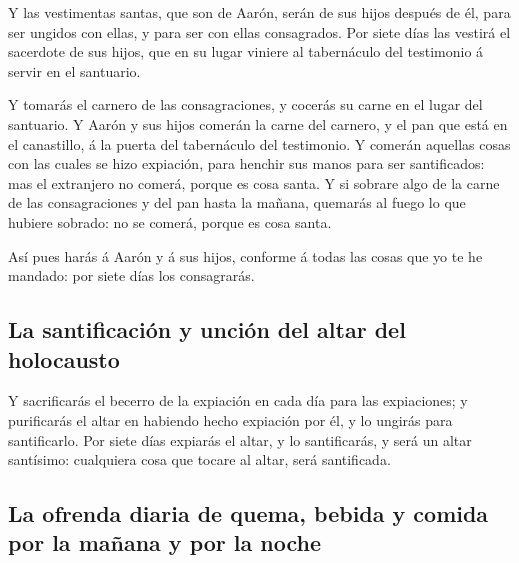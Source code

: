  Y las vestimentas santas, que son de Aarón, serán de sus
hijos después de él, para ser ungidos con ellas, y para ser con ellas
consagrados.  Por siete días las vestirá el sacerdote de
sus hijos, que en su lugar viniere al tabernáculo del testimonio á
servir en el santuario.

 Y tomarás el carnero de las consagraciones, y cocerás su
carne en el lugar del santuario.  Y Aarón y sus hijos
comerán la carne del carnero, y el pan que está en el canastillo, á la
puerta del tabernáculo del testimonio.  Y comerán
aquellas cosas con las cuales se hizo expiación, para henchir sus manos
para ser santificados: mas el extranjero no comerá, porque es cosa
santa.  Y si sobrare algo de la carne de las
consagraciones y del pan hasta la mañana, quemarás al fuego lo que
hubiere sobrado: no se comerá, porque es cosa santa.

 Así pues harás á Aarón y á sus hijos, conforme á todas
las cosas que yo te he mandado: por siete días los consagrarás.

\hypertarget{la-santificaciuxf3n-y-unciuxf3n-del-altar-del-holocausto}{%
\subsection{La santificación y unción del altar del
holocausto}\label{la-santificaciuxf3n-y-unciuxf3n-del-altar-del-holocausto}}

 Y sacrificarás el becerro de la expiación en cada día
para las expiaciones; y purificarás el altar en habiendo hecho expiación
por él, y lo ungirás para santificarlo.  Por siete días
expiarás el altar, y lo santificarás, y será un altar santísimo:
cualquiera cosa que tocare al altar, será santificada.

\hypertarget{la-ofrenda-diaria-de-quema-bebida-y-comida-por-la-mauxf1ana-y-por-la-noche}{%
\subsection{La ofrenda diaria de quema, bebida y comida por la mañana y
por la
noche}\label{la-ofrenda-diaria-de-quema-bebida-y-comida-por-la-mauxf1ana-y-por-la-noche}}

